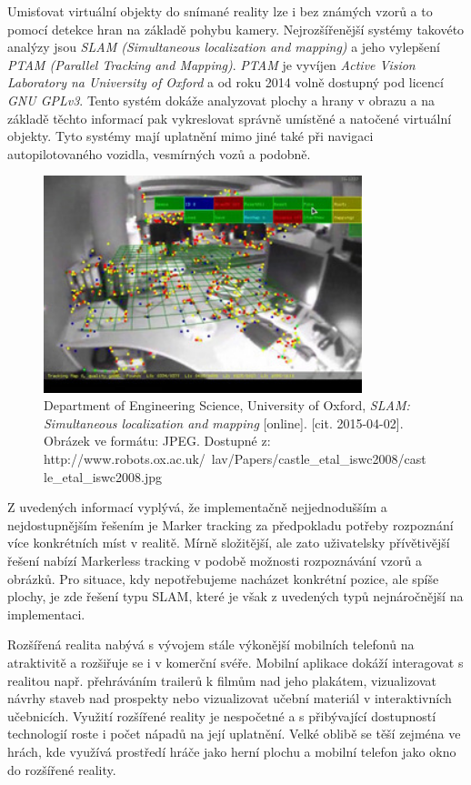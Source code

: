 \documentclass[twoside,12pt]{article}
\begin{document}
Umisťovat virtuální objekty do snímané reality lze i bez známých vzorů a to pomocí detekce hran na základě pohybu kamery. Nejrozšířenější systémy takovéto analýzy jsou \textit{SLAM (Simultaneous localization and mapping)} a jeho vylepšení \textit{PTAM (Parallel Tracking and Mapping)}. \textit{PTAM} je vyvíjen \textit{Active Vision Laboratory na University of Oxford} a od roku 2014 volně dostupný pod licencí \textit{GNU GPLv3}. Tento systém dokáže analyzovat plochy a hrany v obrazu a na základě těchto informací pak vykreslovat správně umístěné a natočené virtuální objekty. Tyto systémy mají uplatnění mimo jiné také při navigaci autopilotovaného vozidla, vesmírných vozů a podobně.

\begin{figure}[H]
    \includegraphics[width=350px, center]{images/slam.jpg}
    
    \caption{Department of Engineering Science, University of Oxford, \textit{SLAM: Simultaneous localization and mapping}
	[online]. [cit. 2015-04-02]. 
	Obrázek ve formátu: JPEG. Dostupné z: http://www.robots.ox.ac.uk/~lav/Papers/castle\_etal\_iswc2008/castle\_etal\_iswc2008.jpg}
    \label{slam}
\end{figure}

Z uvedených informací vyplývá, že implementačně nejjednodušším a nejdostupnějším řešením je Marker tracking za předpokladu potřeby rozpoznání více konkrétních míst v realitě. Mírně složitější, ale zato uživatelsky přívětivější řešení nabízí Markerless tracking v podobě možnosti rozpoznávání vzorů a obrázků. Pro situace, kdy nepotřebujeme nacházet konkrétní pozice, ale spíše plochy, je zde řešení typu SLAM, které je však z uvedených typů nejnáročnější na implementaci.

%
%

Rozšířená realita nabývá s vývojem stále výkonější mobilních telefonů na atraktivitě a rozšiřuje se i v komerční svéře. Mobilní aplikace dokáží interagovat s realitou např. přehráváním trailerů k filmům nad jeho plakátem, vizualizovat návrhy staveb nad prospekty nebo vizualizovat učební materiál v interaktivních učebnicích. Využití rozšířené reality je nespočetné a s přibývající dostupností technologií roste i počet nápadů na její uplatnění. Velké oblibě se těší zejména ve hrách, kde využívá prostředí hráče jako herní plochu a mobilní telefon jako okno do rozšířené reality.
\end{document}
